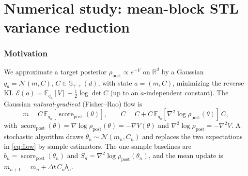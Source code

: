 \documentclass[11pt]{article}
\theoremstyle{plain}
\theoremstyle{definition}
\theoremstyle{remark}
\newcommand{\R}{\mathbb{R}}
\newcommand{\N}{\mathcal{N}}
\newcommand{\E}{\mathbb{E}}
\newcommand{\SPD}{\mathbb{S}_{++}}
\newcommand{\post}{\mathrm{post}}
\newcommand{\bbase}{b_{\mathrm{base}}}
\newcommand{\bstl}{b_{\mathrm{stl}}}
\newcommand{\score}{\operatorname{score}_\post}
\begin{document}
\begin{abstract}
Part~\ref{part:numerics} isolates the effect of mean-block STL numerically. It replaces
the plain posterior-score mean estimator $\bbase(\theta)=\score(\theta)$ by the
score-\emph{residual} estimator $\bstl(\theta)=\score(\theta)+C^{-1}(\theta-m)$, which is
exactly the STL score estimator of the theory (Proposition on pointwise vanishing
mirrors ). Two experiments -- an estimator-level variance
comparison at fixed states and an algorithm-level trajectory comparison -- on a
well-specified anisotropic Gaussian target and a misspecified smooth $\log\cosh$ target
confirm the theory: for the Gaussian target the STL mean estimator has \emph{exactly zero}
variance whenever $C=C_\star$ and the algorithm's stochastic noise floor collapses to
machine precision (the $\Psi\equiv0$, no-floor prediction); for the $\log\cosh$ target STL
reduces the floor but cannot remove it, and under covariance under-dispersion it can even
\emph{increase} the variance. Mean-STL is thus an essentially cost-free, practically
effective variance-reduction device for correctly specified Gaussian families near the
optimum -- but, consistent with the theory, not a universal remedy.
\end{abstract}

\tableofcontents



\part{Numerical study: mean-block STL variance reduction}
\label{part:numerics}

\section{Motivation}
\label{sec:motivation}

We approximate a target posterior $\rho_\post\propto e^{-V}$ on $\R^d$ by a
Gaussian $q_a=\N(m,C)$, $C\in\SPD(d)$, with state $a=(m,C)$, minimizing the
reverse KL $\mathcal{E}(a)=\E_{q_a}[V]-\tfrac12\log\det C$ (up to an
$a$-independent constant). The Gaussian \emph{natural-gradient} (Fisher--Rao)
flow is
\begin{equation}
\label{eq:flow}
\dot m = C\,\E_{q_a}[\score(\theta)],
\qquad
\dot C = C + C\,\E_{q_a}[\nabla^2\log\rho_\post(\theta)]\,C,
\end{equation}
with $\score(\theta)=\nabla\log\rho_\post(\theta)=-\nabla V(\theta)$ and
$\nabla^2\log\rho_\post=-\nabla^2V$. A stochastic algorithm draws
$\theta_n\sim\N(m_n,C_n)$ and replaces the two expectations in
\eqref{eq:flow} by sample estimators. The one-sample baselines are
$b_n=\score(\theta_n)$ and $S_n=\nabla^2\log\rho_\post(\theta_n)$, and the mean
update is $m_{n+1}=m_n+\Delta t\,C_n b_n$.
\end{document}
